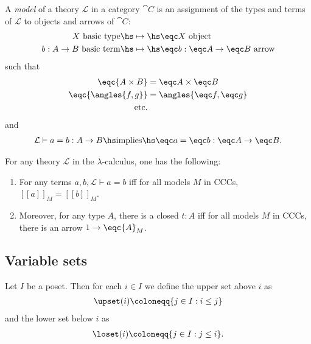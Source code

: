 \documentclass{article}
\begin{document}
\begin{definition}[Awodey p. 138]
	A \emph{model} of a theory $\mathcal{L}$ in a category $\cat C$
	is an assignment of the types and terms of $\mathcal{L}$ to objects
	and arrows of $\cat C$:
	\begin{align*}
		X\text{ basic type} \hs
		 & \mapsto\hs\eqc X \text{ object}                   \\
		b:A\to B\text{ basic term} \hs
		 & \mapsto\hs \eqc b: \eqc A \to \eqc B\text{ arrow}
	\end{align*}
	such that
	\begin{align*}
		\eqc{A\times B}    & = \eqc A \times \eqc B    \\
		\eqc{\angles{f,g}} & = \angles{\eqc f, \eqc g} \\
		\text{etc.}
	\end{align*}
	and
	\begin{align*}
		\mathcal{L}\vdash a = b : A \to B \hs\text{implies}\hs
		\eqc a = \eqc b : \eqc A \to \eqc B.
	\end{align*}
\end{definition}

\begin{proposition}[Awodey p. 139]
	For any theory $\mathcal{L}$ in the $\lambda$-calculus, one has the
	following:
	\begin{enumerate}
		\item For any terms $a,b,\mathcal{L}\vdash a = b$ iff
		      for all models $M$ in CCCs, $[\![a]\!]_M=[\![b]\!]_M$.
		\item Moreover, for any type $A$, there is a closed $t:A$ iff for all models $M$ in CCCs, there is an arrow $1\to\eqc{A}_M$.
	\end{enumerate}
\end{proposition}

\subsection{Variable sets}

\begin{definition}
	Let $I$ be a poset. Then for each $i\in I$ we define
	the upper set above $i$ as
	\begin{align*}
		\upset(i) \coloneqq \{j\in I : i\leq j\}
	\end{align*}
	and the lower set below $i$ as
	\begin{align*}
		\loset(i) \coloneqq \{j\in I : j\leq i\}.
	\end{align*}
\end{definition}
\end{document}

